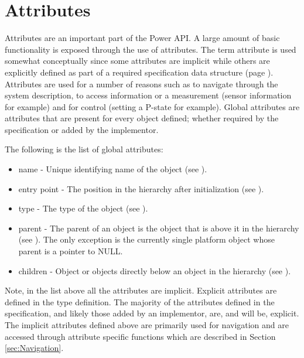 \section{Attributes}\label{sec:TheoryAttributes}
Attributes are an important part of the Power API.
A large amount of basic functionality is exposed through the use of attributes.
The term attribute is used somewhat conceptually since some attributes are implicit while others are explicitly defined as part of a required specification data structure (page \pageref{type:AttrName}).
Attributes are used for a number of reasons such as to navigate through the system description, to access information or a measurement (sensor information for example) and for control (setting a P-state for example).
Global attributes are attributes that are present for every object defined; whether required by the specification or added by the implementor. 

The following is the list of global attributes:
\begin{itemize}[noitemsep,nolistsep] %
\item{name} - Unique identifying name of the object (see ).
\item{entry point} - The position in the hierarchy after initialization (see ).
\item{type} - The type of the object (see ).
\item{parent} - The parent of an object is the object that is above it in the hierarchy (see ).  The only exception is the currently single platform object whose parent is a pointer to NULL. 
\item{children} -  Object or objects directly below an object in the hierarchy (see ).
\end{itemize}

Note, in the list above all the attributes are implicit. 
Explicit attributes are defined in the  type definition.
The majority of the attributes defined in the specification, and likely those added by an implementor, are, and will be, explicit.
The implicit attributes defined above are primarily used for navigation and are accessed through attribute specific functions which are described in Section \ref{sec:Navigation}.

